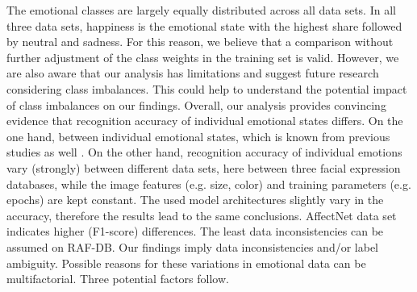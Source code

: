 \documentclass[a4paper, conference]{IEEEtran}
\begin{document}
The emotional classes are largely equally distributed across all data sets. In all three data sets, happiness is the emotional state with the highest share followed by neutral and sadness. For this reason, we believe that a comparison without further adjustment of the class weights in the training set is valid. However, we are also aware that our analysis has limitations and suggest future research considering class imbalances. This could help to understand the potential impact of class imbalances on our findings.
Overall, our analysis provides convincing evidence that recognition accuracy of individual emotional states differs. On the one hand, between individual emotional states, which is known from previous studies as well \cite{generosiDeepLearningbasedSystem2018}.
On the other hand, recognition accuracy of individual emotions vary (strongly) between different data sets, here between three facial expression databases, while the image features (e.g. size, color) and training parameters (e.g. epochs) are kept constant. The used model architectures slightly vary in the accuracy, therefore the results lead to the same conclusions. AffectNet data set indicates higher (F1-score) differences. The least data inconsistencies can be assumed on RAF-DB. Our findings imply data inconsistencies and/or label ambiguity. Possible reasons for these variations in emotional data can be multifactorial. Three potential factors follow.
\end{document}
